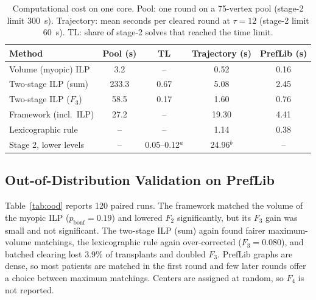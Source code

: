 \documentclass[journal]{IEEEtran}
\begin{document}
\begin{table}[!htbp]
\caption{Computational cost on one core. Pool: one round on a
75-vertex pool (stage-2 limit 300~s). Trajectory: mean seconds per
cleared round at $\tau = 12$ (stage-2 limit 60~s). TL: share of
stage-2 solves that reached the time limit.}
\label{tab:cost}
\begin{tabular}{lcccc}
\toprule
Method & Pool (s) & TL & Trajectory (s) & PrefLib (s) \\
\midrule
Volume (myopic) ILP          & 3.2   & --     & 0.52     & 0.16 \\
Two-stage ILP (sum)          & 233.3 & 0.67   & 5.08     & 2.45 \\
Two-stage ILP ($F_3$)        & 58.5  & 0.17   & 1.60     & 0.76 \\
Framework (incl.\ ILP)       & 27.2  & --     & 19.30    & 4.41 \\
Lexicographic rule           & --    & --     & 1.14     & 0.38 \\
Stage 2, lower levels  & --    & 0.05--0.12$^{a}$ & 24.96$^{b}$ & -- \\
\bottomrule
\end{tabular}
\end{table}

\subsection{Out-of-Distribution Validation on PrefLib}
\label{sec:results:ood}

Table~\ref{tab:ood} reports 120 paired runs. The framework matched the
volume of the myopic ILP ($p_{\mathrm{bonf}} = 0.19$) and lowered $F_2$
significantly, but its $F_3$ gain was small and not significant. The
two-stage ILP (sum) again found fairer maximum-volume matchings, the
lexicographic rule again over-corrected ($F_3 = 0.080$), and batched
clearing lost 3.9\% of transplants and doubled $F_3$. PrefLib graphs are
dense, so most patients are matched in the first round and few later
rounds offer a choice between maximum matchings. Centers are assigned at
random, so $F_4$ is not reported.
\end{document}

